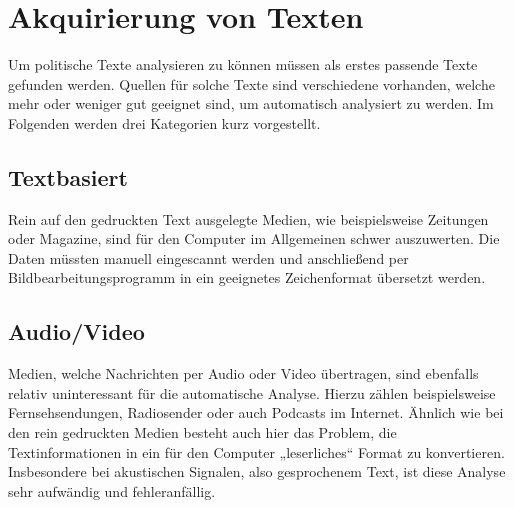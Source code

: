\section{Akquirierung von Texten}
Um politische Texte analysieren zu können müssen als erstes passende Texte gefunden werden. Quellen für solche Texte sind verschiedene vorhanden, welche mehr oder weniger gut geeignet sind, um automatisch analysiert zu werden. Im Folgenden werden drei Kategorien kurz vorgestellt.

\subsection{Textbasiert}
Rein auf den gedruckten Text ausgelegte Medien, wie beispielsweise Zeitungen oder Magazine, sind für den Computer im Allgemeinen schwer auszuwerten. Die Daten müssten manuell eingescannt werden und anschließend per Bildbearbeitungsprogramm in ein geeignetes Zeichenformat übersetzt werden. 

\subsection{Audio/Video}
Medien, welche Nachrichten per Audio oder Video übertragen, sind ebenfalls relativ uninteressant für die automatische Analyse. Hierzu zählen beispielsweise Fernsehsendungen, Radiosender oder auch Podcasts im Internet. Ähnlich wie bei den rein gedruckten Medien besteht auch hier das Problem, die Textinformationen in ein für den Computer „leserliches“ Format zu konvertieren. Insbesondere bei akustischen Signalen, also gesprochenem Text, ist diese Analyse sehr aufwändig und fehleranfällig. 

